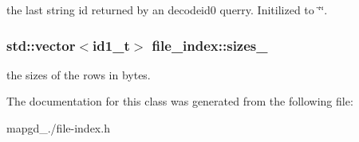 the last string id returned by an decodeid0 querry. Initilized to \char`\"{}\char`\"{}. \hypertarget{classfile__index_a9be03afd832c7b341c13736733495c79}{
\subsubsection[{sizes\-\_\-}]{\setlength{\rightskip}{0pt plus 5cm}std\-::vector$<$id1\-\_\-t$>$ file\-\_\-index\-::sizes\-\_\-\hspace{0.3cm}{\ttfamily [private]}}}\label{classfile__index_a9be03afd832c7b341c13736733495c79}
the sizes of the rows in bytes. 

The documentation for this class was generated from the following file\-:\begin{DoxyCompactItemize}
\item 
mapgd\-\_./file-\/index.\-h\end{DoxyCompactItemize}
